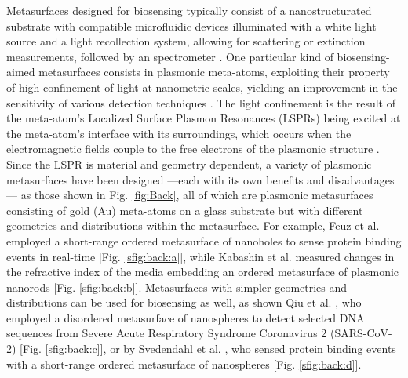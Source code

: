 Metasurfaces designed for biosensing typically consist of a nanostructurated substrate with compatible microfluidic devices illuminated with a white light source and a light recollection system, allowing for scattering or extinction measurements, followed by an spectrometer \cite{estevez_trends_2014,feuz_improving_2010}. One particular kind of  biosensing-aimed metasurfaces consists in plasmonic meta-atoms, exploiting their property of high confinement of light at nanometric scales, yielding an improvement in the sensitivity of various detection techniques \cite{khan_optical_2022}. The light confinement is the result of the meta-atom's Localized Surface Plasmon Resonances (LSPRs) being excited at the meta-atom's interface with its surroundings, which occurs when the electromagnetic fields couple to the free electrons of the plasmonic structure \cite{chen_review_2016,kim_plasmonic_2019,estevez_trends_2014}.  Since the LSPR is material and geometry dependent, a variety of plasmonic metasurfaces have been designed \cite{feuz_improving_2010,kabashin_plasmonic_2009,qiu_dual_2020,svedendahl_refractometric_2014} ---each with its own benefits and disadvantages \cite{chen_review_2016,estevez_trends_2014}--- as those shown in  Fig. \ref{fig:Back}, all of which are plasmonic metasurfaces consisting of gold (Au) meta-atoms on a glass substrate but with different geometries and distributions within the metasurface.  For example, Feuz et al. \cite{feuz_improving_2010} employed a short-range ordered metasurface of nanoholes to sense protein binding events in real-time [Fig. \ref{sfig:back:a}], while  Kabashin et al. \cite{kabashin_plasmonic_2009} measured  changes in the refractive index of the media embedding an ordered metasurface of plasmonic nanorods [Fig. \ref{sfig:back:b}].  Metasurfaces with simpler geometries and distributions can be used  for biosensing as well, as shown Qiu et al. \cite{qiu_dual_2020}, who employed a disordered metasurface of nanospheres to detect selected DNA sequences from Severe Acute Respiratory Syndrome Coronavirus 2 (SARS-CoV-2) [Fig. \ref{sfig:back:c}], or by Svedendahl et al. \cite{svedendahl_refractometric_2014}, who sensed protein binding events with a short-range ordered metasurface of nanospheres [Fig. \ref{sfig:back:d}].


